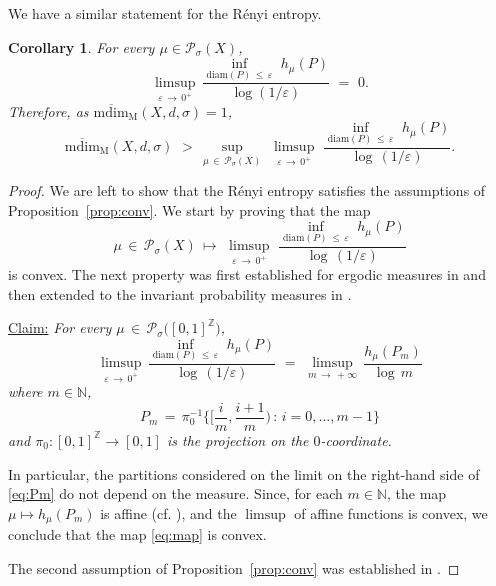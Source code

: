 \documentclass[11pt,a4paper,reqno]{amsart}
\newenvironment{claim}[1]{\par\noindent\underline{Claim:}\space#1}{}
\theoremstyle{plain}
\newtheorem{corollary}[theorem]{Corollary}
\theoremstyle{definition}
\newcommand{\field}[1]{\mathbb{#1}}
\newcommand{\ZZ}{\field{Z}}
\newcommand{\NN}{\field{N}}
\newcommand{\ep} {\varepsilon}
\newcommand{\vep}{\varepsilon}
\newcommand{\si} {\sigma}       \newcommand{\Si}{\Sigma}
\newcommand{\cP}{{\mathcal P}}
\begin{document}
\smallskip

We have a similar statement for the Rényi entropy.

\begin{corollary}
For every $\mu\in\cP_\si(X)$, $$\limsup_{\ep\,\to\,0^+}\,\frac{\inf_{\mathrm{diam}(P)\,\le\, \varepsilon} \,\,h_\mu(P)}{\log(1/\ep)}\,\,=\,\,0.$$
Therefore, as $\mathrm{\overline{mdim}_M}(X,d,\sigma)=1$,
$$\mathrm{\overline{mdim}_M}(X,d,\sigma) \,\, >\, \sup_{\mu\,\in\,\cP_\sigma(X)}\,\,  \limsup_{\vep \, \to \, 0^+} \, \,\frac{\inf_{\mathrm{diam}(P)\,\le\, \varepsilon}\,\, h_\mu(P)}{\log \,(1/\vep)}.$$
\end{corollary}

\begin{proof}
We are left to show that the Rényi entropy satisfies the assumptions of Proposition~\ref{prop:conv}. We start by proving that the map
\begin{equation}\label{eq:map}
\mu\,\in\,\cP_\si(X)\,\longmapsto\,\,\limsup_{\vep \, \to \, 0^+} \, \,\frac{\inf_{\mathrm{diam}(P)\,\le\, \varepsilon} \,\,h_\mu(P)}{\log \,(1/\vep)}
\end{equation}
is convex. The next property was first established for ergodic measures in \cite{GS} and then extended to the invariant probability measures in \cite{Yang}.\\

\begin{claim}\cite{GS, Yang} \emph{For every $\mu\,\in\,\cP_\si\big([0,1]^\ZZ\big)$, 
\begin{equation}\label{eq:Pm}
\limsup_{\vep \, \to \, 0^+} \, \frac{\inf_{\mathrm{diam}(P)\,\le\, \varepsilon}\,\, h_\mu(P)}{\log \,(1/\vep)}\,\,=\,\,\limsup_{m \, \to \, +\infty} \, \frac{ h_\mu(P_m)}{\log \,m}
\end{equation}
where $m\in\NN$,
$$P_m \,=\, \pi_0^{-1}\Big\{\Big[\frac{i}{m},\frac{i+1}{m}\Big)\,\colon\,i=0,...,m-1 \Big\}$$
and $\pi_0 \colon [0,1]^\ZZ \to [0,1]$ is the projection on the $0$-coordinate.} 
\end{claim}
\medskip

In particular, the partitions considered on the limit on the right-hand side of \eqref{eq:Pm} do not depend on the measure. Since, for each $m \in \NN$, the map $\mu\mapsto h_\mu(P_m)$ is affine (cf. \cite[Proof of Theorem 8.1]{Wa}), and the $\limsup$ of affine functions is convex, we conclude that the map \eqref{eq:map} is convex.
\smallskip

The second assumption of Proposition~\ref{prop:conv} was established in \cite[Section~3]{GS}.
\end{proof}
\end{document}
